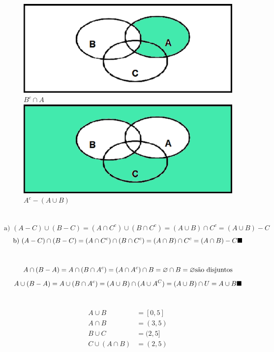 \documentclass[12pt]{article}
\begin{document}
\begin{figure}[h!]
		\includegraphics[scale=0.5]{q8e} $ B^c \cap A $ \\
		\includegraphics[scale=0.5]{q8f} $ A^c - (A \cup B) $ \\
	\end{figure}

\newpage

\section{} \[
	\text{a) } (A - C) \cup (B - C) =
	(A \cap C^c) \cup (B \cap C^c) =
	(A \cup B) \cap C^c =
	(A \cup B) - C
\] \[
	\text{b) } (A - C) \cap (B - C) =
	(A \cap C^c) \cap (B \cap C^c) =
	(A \cap B) \cap C^c =
	(A \cap B) - C
	\hfill \blacksquare
\]

\section{} \[
	A \cap (B - A) =
	A \cap (B \cap A^c) =
	(A \cap A^c) \cap B =
	\varnothing \cap B =
	\varnothing
	\hfill \text{são disjuntos}
\] \[
	A \cup (B - A) =
	A \cup (B \cap A^c) =
	(A \cup B) \cap (A \cup A^C) =
	(A \cup B) \cap U =
	A \cup B
	\hfill \blacksquare
\]

\section{}
	\begin{align*}
		A \cup B &= [0,5] \\
		A \cap B &= (3,5) \\
		B \cup C &= (2,5] \\
		C \cup (A \cap B) &= (2,5) \\
	\end{align*}
\end{document}

